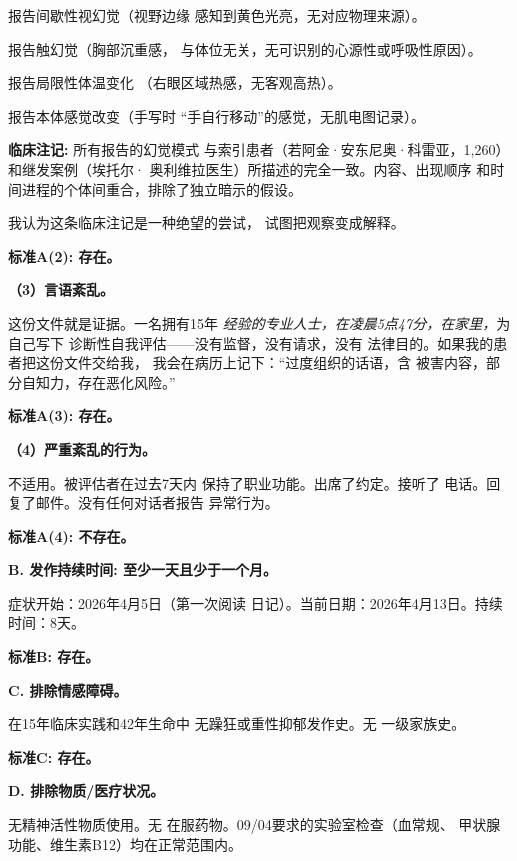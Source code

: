 \noindent 报告间歇性视幻觉（视野边缘
\noindent 感知到黄色光亮，无对应物理来源）。

\noindent 报告触幻觉（胸部沉重感，
\noindent 与体位无关，无可识别的心源性或呼吸性原因）。

\noindent 报告局限性体温变化
\noindent （右眼区域热感，无客观高热）。

\noindent 报告本体感觉改变（手写时
\noindent \textquotedblleft{}手自行移动\textquotedblright{}的感觉，无肌电图记录）。

\noindent \textbf{临床注记:} 所有报告的幻觉模式
\noindent 与索引患者（若阿金·安东尼奥·科雷亚，1,260）和继发案例（埃托尔·
\noindent 奥利维拉医生）所描述的完全一致。内容、出现顺序
\noindent 和时间进程的个体间重合，排除了独立暗示的假设。

\noindent 我认为这条临床注记是一种绝望的尝试，
\noindent 试图把观察变成解释。

\noindent \textbf{标准A(2): 存在。}

\noindent \textbf{（3）言语紊乱。}

\noindent 这份文件就是证据。一名拥有15年
\noindent \textit{经验的专业人士，在凌晨5点47分，在家里，}为自己写下
\noindent 诊断性自我评估——没有监督，没有请求，没有
\noindent 法律目的。如果我的患者把这份文件交给我，
\noindent 我会在病历上记下：\textquotedblleft{}过度组织的话语，含
\noindent 被害内容，部分自知力，存在恶化风险。\textquotedblright{}

\noindent \textbf{标准A(3): 存在。}

\noindent \textbf{（4）严重紊乱的行为。}

\noindent 不适用。被评估者在过去7天内
\noindent 保持了职业功能。出席了约定。接听了
\noindent 电话。回复了邮件。没有任何对话者报告
\noindent 异常行为。

\noindent \textbf{标准A(4): 不存在。}

\noindent \textbf{B. 发作持续时间: 至少一天且少于一个月。}

\noindent 症状开始：2026年4月5日（第一次阅读
\noindent 日记）。当前日期：2026年4月13日。持续时间：8天。

\noindent \textbf{标准B: 存在。}

\noindent \textbf{C. 排除情感障碍。}

\noindent 在15年临床实践和42年生命中
\noindent 无躁狂或重性抑郁发作史。无
\noindent 一级家族史。

\noindent \textbf{标准C: 存在。}

\noindent \textbf{D. 排除物质\slash 医疗状况。}

\noindent 无精神活性物质使用。无
\noindent 在服药物。09/04要求的实验室检查（血常规、
\noindent 甲状腺功能、维生素B12）均在正常范围内。

